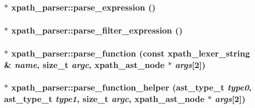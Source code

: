 \label{structxpath__parser_aa63ac82f43eaa1c9f8769174adc87f48}
\hypertarget{structxpath__parser_adb814ff3b99621d2a1c8e788ffd1c1c5}{
\subsubsection[{parse\_\-expression}]{$\ast$ xpath\_\-parser::parse\_\-expression ()}}
\label{structxpath__parser_adb814ff3b99621d2a1c8e788ffd1c1c5}
\hypertarget{structxpath__parser_a0530aefc1445c4eac4614e895dd0a219}{
\subsubsection[{parse\_\-filter\_\-expression}]{$\ast$ xpath\_\-parser::parse\_\-filter\_\-expression ()}}
\label{structxpath__parser_a0530aefc1445c4eac4614e895dd0a219}
\hypertarget{structxpath__parser_a7acb32147ef3aac058f94257b57ff14f}{
\subsubsection[{parse\_\-function}]{$\ast$ xpath\_\-parser::parse\_\-function (const {\bf xpath\_\-lexer\_\-string} \& {\em name}, \/  size\_\-t {\em argc}, \/  {\bf xpath\_\-ast\_\-node} $\ast$ {\em args}\mbox{[}2\mbox{]})}}
\label{structxpath__parser_a7acb32147ef3aac058f94257b57ff14f}
\hypertarget{structxpath__parser_a21a1a2579c610e0ebd76247b9d325bb1}{
\subsubsection[{parse\_\-function\_\-helper}]{$\ast$ xpath\_\-parser::parse\_\-function\_\-helper ({\bf ast\_\-type\_\-t} {\em type0}, \/  {\bf ast\_\-type\_\-t} {\em type1}, \/  size\_\-t {\em argc}, \/  {\bf xpath\_\-ast\_\-node} $\ast$ {\em args}\mbox{[}2\mbox{]})}}
